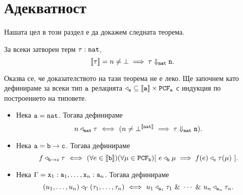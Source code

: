 \section{Адекватност}
Нашата цел в този раздел е да докажем следната теорема.
\begin{framed}
  \begin{theorem}
    За всеки затворен терм $\tau : \texttt{nat}$, 
    \[\llbracket{\tau}\rrbracket = n \neq \bot \implies \tau \Downarrow_{\texttt{nat}} \texttt{n}.\]
  \end{theorem}
\end{framed}

Оказва се, че доказателството на тази теорема не е леко.
Ще започнем като дефинираме за всеки тип $\texttt{a}$ релацията 
$\triangleleft_{\texttt{a}} \subseteq \llbracket{\texttt{a}}\rrbracket \times \texttt{PCF}_{\texttt{a}}$
с индукция по построението на типовете.

\begin{itemize}
\item
  Нека $\texttt{a} = \texttt{nat}$. Тогава дефинираме
  \[n \triangleleft_{\texttt{nat}} \tau \ \Longleftrightarrow\  ( n\neq\bot^{\llbracket{\texttt{nat}}\rrbracket} \implies \tau \Downarrow_{\texttt{nat}} \texttt{n}).\]
\item
  Нека $\texttt{a} = \texttt{b} \to \texttt{c}$. Тогава дефинираме
  \[f \triangleleft_{\texttt{b}\to\texttt{c}} \tau \ \Longleftrightarrow\  (\forall e\in \llbracket{\texttt{b}}\rrbracket)(\forall \mu \in \texttt{PCF}_{\texttt{b}})[\ e \triangleleft_{\texttt{b}} \mu \implies f(e) \triangleleft_{\texttt{c}} \tau(\mu)\ ].\]
\item
  Нека $\Gamma = \texttt{x}_1:\texttt{a}_1, \dots, \texttt{x}_n:\texttt{a}_n$. Тогава дефинираме 
  \[(u_1,\dots,u_n) \triangleleft_\Gamma (\tau_1,\dots,\tau_n) \iff u_1 \triangleleft_{\vv{a}_1} \tau_1\ \&\ \cdots\ \&\ u_n \triangleleft_{\vv{a}_n} \tau_n.\]
\end{itemize}

